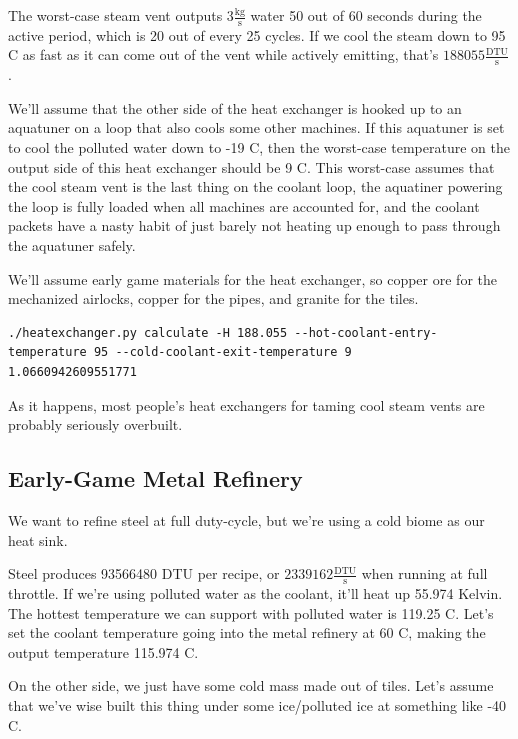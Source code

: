 \documentclass{article}
\numberwithin{equation}{subsection}
\theoremstyle{remark}
\begin{document}
The worst-case steam vent outputs \(3 \frac{\mathrm{kg}}{\mathrm{s}}\) water 50 out of 60 seconds during the active period, which is 20 out of every 25 cycles.  If we cool the steam down to 95 \degree{}C as fast as it can come out of the vent while actively emitting, that's \(188055 \frac{\mathrm{DTU}}{\mathrm{s}}\).

We'll assume that the other side of the heat exchanger is hooked up to an aquatuner on a loop that also cools some other machines.
If this aquatuner is set to cool the polluted water down to -19 \degree{}C, then the worst-case temperature on the output side of this heat exchanger should be 9 \degree{}C.
This worst-case assumes that the cool steam vent is the last thing on the coolant loop, the aquatiner powering the loop is fully loaded when all machines are accounted for, and the coolant packets have a nasty habit of just barely not heating up enough to pass through the aquatuner safely.

We'll assume early game materials for the heat exchanger, so copper ore for the mechanized airlocks, copper for the pipes, and granite for the tiles.

\begin{verbatim}
./heatexchanger.py calculate -H 188.055 --hot-coolant-entry-temperature 95 --cold-coolant-exit-temperature 9
1.0660942609551771
\end{verbatim}

As it happens, most people's heat exchangers for taming cool steam vents are probably seriously overbuilt.

\subsection{Early-Game Metal Refinery}

We want to refine steel at full duty-cycle, but we're using a cold biome as our heat sink.

Steel produces 93566480 DTU per recipe, or \(2339162 \frac{\mathrm{DTU}}{\mathrm{s}}\) when running at full throttle.
If we're using polluted water as the coolant, it'll heat up 55.974 Kelvin.
The hottest temperature we can support with polluted water is 119.25 \degree{}C.
Let's set the coolant temperature going into the metal refinery at 60 \degree{}C, making the output temperature 115.974 \degree{}C.

On the other side, we just have some cold mass made out of tiles.
Let's assume that we've wise built this thing under some ice/polluted ice at something like -40 \degree{}C.
\end{document}
